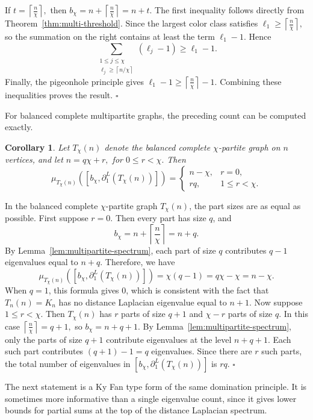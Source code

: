 \documentclass[12pt]{article}
\newcommand{\ceil}[1]{\left\lceil #1 \right\rceil}
\theoremstyle{plain}
\newtheorem{corollary}[theorem]{Corollary}
\theoremstyle{definition}
\renewenvironment{proof}{{\noindent\bfseries Proof. }}{\hfill$\square$\par}
\begin{document}
\begin{proof}
	If  $t=\ceil{\frac{n}{\chi}},$ then  $b_\chi=n+\ceil{\frac{n}{\chi}}=n+t.$ The first inequality follows directly from Theorem~\ref{thm:multi-threshold}. Since the largest color class satisfies
	 $\ell_1\ge\ceil{\frac{n}{\chi}},$ so the summation on the right contains at least the term $\ell_1-1$. Hence
	\[
	\sum_{\substack{1\le j\le\chi\\ \ell_j\ge \ceil{n/\chi}}}(\ell_j-1)
	\ge \ell_1-1.
	\]
	Finally, the pigeonhole principle gives $\ell_1-1\ge \ceil{\frac{n}{\chi}}-1.$ Combining these inequalities proves the result.
\end{proof}

\noindent For balanced complete multipartite graphs, the preceding count can be computed exactly.
\begin{corollary}\label{cor:balanced-count}
	Let $T_\chi(n)$ denote the balanced complete $\chi$-partite graph on $n$ vertices, and let
	 $n=q\chi+r,$ for  $0\le r<\chi.$ Then
	\[
	\mu_{T_\chi(n)}([b_\chi,\partial^{L}_1(T_\chi(n))])=
	\begin{cases}
		n-\chi, & r=0,\\[1mm]
		rq, & 1\le r<\chi.
	\end{cases}
	\]
\end{corollary}

\begin{proof}
	In the balanced complete $\chi$-partite graph $T_\chi(n)$, the part sizes are as equal as possible. First suppose $r=0$. Then every part has size $q$, and
	\[
	b_\chi=n+\ceil{\frac{n}{\chi}}=n+q.
	\]
	By Lemma~\ref{lem:multipartite-spectrum}, each part of size $q$ contributes $q-1$ eigenvalues equal to $n+q$. Therefore, we have
	\[
	\mu_{T_\chi(n)}([b_\chi,\partial^{L}_1(T_\chi(n))])
	=
	\chi(q-1)
	=
	q\chi-\chi
	=
	n-\chi.
	\]
	When $q=1$, this formula gives $0$, which is consistent with the fact that $T_n(n)=K_n$ has no distance Laplacian eigenvalue equal to $n+1$. Now suppose $1\le r<\chi$. Then $T_\chi(n)$ has $r$ parts of size $q+1$ and $\chi-r$ parts of size $q$. In this case $\ceil{\frac{n}{\chi}}=q+1,$ so $b_\chi=n+q+1.$ By Lemma~\ref{lem:multipartite-spectrum}, only the parts of size $q+1$ contribute eigenvalues at the level $n+q+1$. Each such part contributes
	 $(q+1)-1=q$ eigenvalues. Since there are $r$ such parts, the total number of eigenvalues in
	$[b_\chi,\partial^{L}_1(T_\chi(n))]$ is $rq.$  
\end{proof}

\medskip
\noindent The next statement is a Ky Fan type form of the same domination principle. It is sometimes more informative than a single eigenvalue count, since it gives lower bounds for partial sums at the top of the distance Laplacian spectrum.
\end{document}
